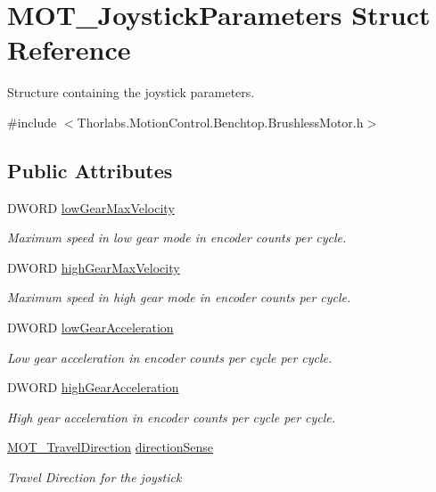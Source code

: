 \hypertarget{struct_m_o_t___joystick_parameters}{}\section{M\+O\+T\+\_\+\+Joystick\+Parameters Struct Reference}
\label{struct_m_o_t___joystick_parameters}


Structure containing the joystick parameters.  




{\ttfamily \#include $<$Thorlabs.\+Motion\+Control.\+Benchtop.\+Brushless\+Motor.\+h$>$}

\subsection*{Public Attributes}
\begin{DoxyCompactItemize}
\item 
D\+W\+O\+RD \hyperlink{struct_m_o_t___joystick_parameters_af1a11840ffd6d87d94517b5f37fbb753}{low\+Gear\+Max\+Velocity}
\begin{DoxyCompactList}\small\item\em Maximum speed in low gear mode in encoder counts per cycle. \end{DoxyCompactList}\item 
D\+W\+O\+RD \hyperlink{struct_m_o_t___joystick_parameters_ad51990e3ea03f8103ad1e5d72c4a5a71}{high\+Gear\+Max\+Velocity}
\begin{DoxyCompactList}\small\item\em Maximum speed in high gear mode in encoder counts per cycle. \end{DoxyCompactList}\item 
D\+W\+O\+RD \hyperlink{struct_m_o_t___joystick_parameters_a489c5768d30741a268d6bf31e8cb6404}{low\+Gear\+Acceleration}
\begin{DoxyCompactList}\small\item\em Low gear acceleration in encoder counts per cycle per cycle. \end{DoxyCompactList}\item 
D\+W\+O\+RD \hyperlink{struct_m_o_t___joystick_parameters_a002634fed9cb3c390056f34822c15910}{high\+Gear\+Acceleration}
\begin{DoxyCompactList}\small\item\em High gear acceleration in encoder counts per cycle per cycle. \end{DoxyCompactList}\item 
\hyperlink{group___common_ga70a2a2ac296464f3d846c30d71d18daa}{M\+O\+T\+\_\+\+Travel\+Direction} \hyperlink{struct_m_o_t___joystick_parameters_a25f504f34b7678e0cb381a9371103c3e}{direction\+Sense}
\begin{DoxyCompactList}\small\item\em Travel Direction for the joystick \end{DoxyCompactList}\end{DoxyCompactItemize}


